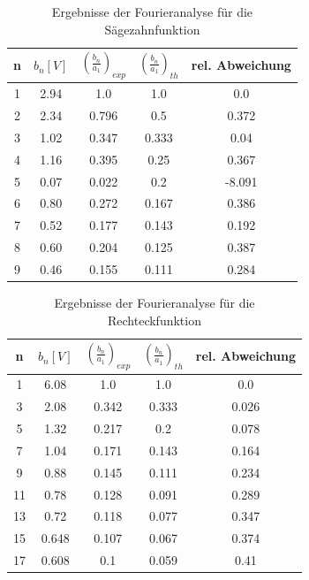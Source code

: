 \documentclass[11pt,ngerman,a4paper]{article}
\begin{document}
\begin{table}
\centering
\begin{tabular}{|c|c|c|c|c|}
\hline
n & $b_n [V]$ & $(\frac{b_n}{a_1})_{exp}$ & $(\frac{b_n}{a_1})_{th}$ & rel. Abweichung\\
\hline
1&2.94 & 1.0 & 1.0 & 0.0\\
2&2.34 & 0.796 & 0.5 & 0.372\\
3&1.02 & 0.347 & 0.333 & 0.04\\
4&1.16 & 0.395 & 0.25 & 0.367\\
5&0.07 & 0.022 & 0.2 & -8.091\\
6&0.80 & 0.272 & 0.167 & 0.386\\
7&0.52 & 0.177 & 0.143 & 0.192\\
8&0.60 & 0.204 & 0.125 & 0.387\\
9&0.46 & 0.155 & 0.111 & 0.284\\
\hline
\end{tabular}

\label{saw}
\caption{Ergebnisse der Fourieranalyse für die Sägezahnfunktion}
\end{table}

\begin{table}
\centering
\begin{tabular}{|c|c|c|c|c|}
\hline

n & $b_n [V]$ & $(\frac{b_n}{a_1})_{exp}$ & $(\frac{b_n}{a_1})_{th}$ & rel. Abweichung\\
\hline
1&6.08 & 1.0 & 1.0 & 0.0\\
3&2.08 & 0.342 & 0.333 & 0.026\\
5&1.32 & 0.217 & 0.2 & 0.078\\
7&1.04 & 0.171 & 0.143 & 0.164\\
9&0.88 & 0.145 & 0.111 & 0.234\\
11&0.78 & 0.128 & 0.091 & 0.289\\
13&0.72 & 0.118 & 0.077 & 0.347\\
15&0.648 & 0.107 & 0.067 & 0.374\\
17&0.608 & 0.1 & 0.059 & 0.41\\
\hline
\end{tabular}
\label{rect}
\caption{Ergebnisse der Fourieranalyse für die Rechteckfunktion}
\end{table}
\end{document}
